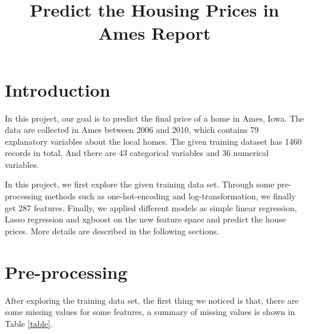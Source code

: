 \documentclass{article}
\title{Predict the Housing Prices in Ames Report}
\begin{document}
%
\maketitle

\section{Introduction}
In this project, our goal is to predict the final price of a home in Ames, Iowa. The data are collected in Ames between 2006 and 2010, which contains 79 explanatory variables about the local homes. The given training dataset has 1460 records in total. And there are 43 categorical variables and 36 numerical variables. 

In this project, we first explore the given training data set. Through some pre-processing methods such as one-hot-encoding and log-transformation, we finally get 287 features. Finally, we applied different models as simple linear regression, Lasso regression and xgboost on the new feature space and predict the house prices. More details are described in the following sections.

\section{Pre-processing}
After exploring the training data set, the first thing we noticed is that, there are some missing values for some features, a summary of missing values is shown in Table \ref{table}.
\end{document}
